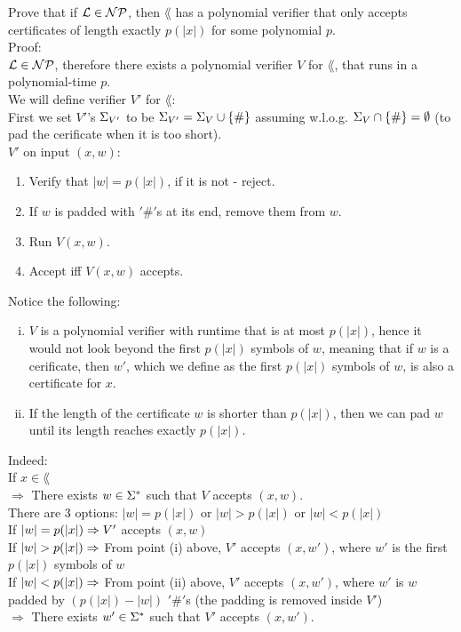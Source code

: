 Prove that if $\mathcal{L} \in \mathcal{N}\mathcal{P}$, then $\lang$ has a polynomial verifier that only accepts
certificates of length exactly $p(|x|)$ for some polynomial $p$. \\

Proof: \\
$\mathcal{L} \in \mathcal{N}\mathcal{P}$, therefore there exists a polynomial verifier $V$ for $\lang$, that runs in a polynomial-time $p$. \\
We will define verifier $V'$ for $\lang$: \\
First we set $V'$'s $\Sigma_{V'}$ to be $\Sigma_{V'}=\Sigma_{V} \cup \{\#\}$ assuming w.l.o.g.
$\Sigma_{V} \cap \{\#\} = \emptyset$ (to pad the cerificate when it is too short). \\

$V'$ on input $(x, w)$:
\begin{enumerate}[1., itemsep=5pt]

    \item Verify that $|w|=p(|x|)$, if it is not - reject.
    \item If $w$ is padded with $'\#'$s at its end, remove them from $w$.
    \item Run $V(x, w)$.
    \item Accept iff $V(x, w)$ accepts.

\end{enumerate}


Notice the following:
\begin{enumerate}[(i), itemsep=5pt]
    \item $V$ is a polynomial verifier with runtime that is at most $p(|x|)$, hence it would not look beyond the first $p(|x|)$ symbols of $w$,
          meaning that if $w$ is a cerificate, then $w'$, which we define as the first $p(|x|)$ symbols of $w$, is also a certificate for $x$.

    \item If the length of the certificate $w$ is shorter than $p(|x|)$, then we can pad $w$ until its length reaches exactly $p(|x|)$.

\end{enumerate}

Indeed: \\
If $x \in \lang$ \\
$\Rightarrow $ There exists $w \in \Sigma^*$ such that $V$ accepts $(x, w)$. \\
There are 3 options: $|w| = p(|x|)$ or $|w| > p(|x|)$ or $|w| < p(|x|)$ \\
If $|w| = p(|x|) \\ \Rightarrow V'$ accepts $(x, w)$ \\
If $|w| > p(|x|) \\ \Rightarrow $ From point (i) above, $V'$ accepts $(x, w')$, where $w'$ is the first $p(|x|)$ symbols of $w$ \\
If $|w| < p(|x|) \\ \Rightarrow $ From point (ii) above, $V'$ accepts $(x, w')$, where $w'$ is $w$ padded by $(p(|x|) - |w|)$ $'\#'$s (the padding is removed inside $V'$) \\
$\Longrightarrow $ There exists $w' \in \Sigma^*$ such that $V'$ accepts $(x, w')$. \\

